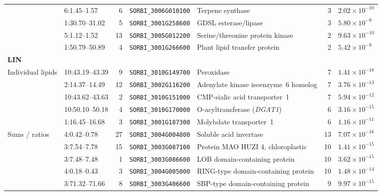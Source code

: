 \documentclass[9pt,twocolumn,twoside]{rilabRxiv}
\begin{document}
\begin{table}[!ht]
\begin{tabular}{llrllrl}
 & 6:1.45--1.57 & 6 & \texttt{SORBI\_3006G010100} & Terpene synthase & 3 & $2.02\times10^{-10}$ \\
 & 1:30.70--31.02 & 5 & \texttt{SORBI\_3001G258600} & GDSL esterase/lipase & 3 & $5.80\times10^{-9}$ \\
 & 5:1.12--1.52 & 13 & \texttt{SORBI\_3005G012200} & Serine/threonine protein kinase & 2 & $9.63\times10^{-10}$ \\
 & 1:50.79--50.89 & 4 & \texttt{SORBI\_3001G266600} & Plant lipid transfer protein & 2 & $5.42\times10^{-9}$ \\
\midrule
\multicolumn{7}{l}{\textbf{LIN}} \\
Individual lipids & 10:43.19--43.39 & 9 & \texttt{SORBI\_3010G149700} & Peroxidase & 7 & $1.41\times10^{-18}$ \\
 & 2:14.37--14.49 & 12 & \texttt{SORBI\_3002G116200} & Adenylate kinase isoenzyme~6 homolog & 7 & $3.76\times10^{-13}$ \\
 & 10:43.62--43.63 & 2 & \texttt{SORBI\_3010G151000} & CMP-sialic acid transporter~1 & 7 & $5.94\times10^{-12}$ \\
 & 10:50.10--50.18 & 4 & \texttt{SORBI\_3010G170000} & O-acyltransferase (\textit{DGAT1}) & 6 & $3.16\times10^{-15}$ \\
 & 1:16.45--16.68 & 3 & \texttt{SORBI\_3001G187300} & Molybdate transporter~1 & 6 & $1.16\times10^{-11}$ \\
\addlinespace
Sums / ratios & 4:0.42--0.78 & 27 & \texttt{SORBI\_3004G004800} & Soluble acid invertase & 13 & $7.07\times10^{-16}$ \\
 & 3:7.54--7.78 & 15 & \texttt{SORBI\_3003G087100} & Protein MAO HUZI 4, chloroplastic & 10 & $1.41\times10^{-15}$ \\
 & 3:7.48--7.48 & 1 & \texttt{SORBI\_3003G086600} & LOB domain-containing protein & 10 & $3.62\times10^{-15}$ \\
 & 4:0.18--0.43 & 3 & \texttt{SORBI\_3004G005000} & RING-type domain-containing protein & 10 & $1.48\times10^{-14}$ \\
 & 3:71.32--71.66 & 8 & \texttt{SORBI\_3003G406600} & SBP-type domain-containing protein & 9 & $9.97\times10^{-15}$ \\
\bottomrule
\end{tabular}
\end{table}
\end{document}
